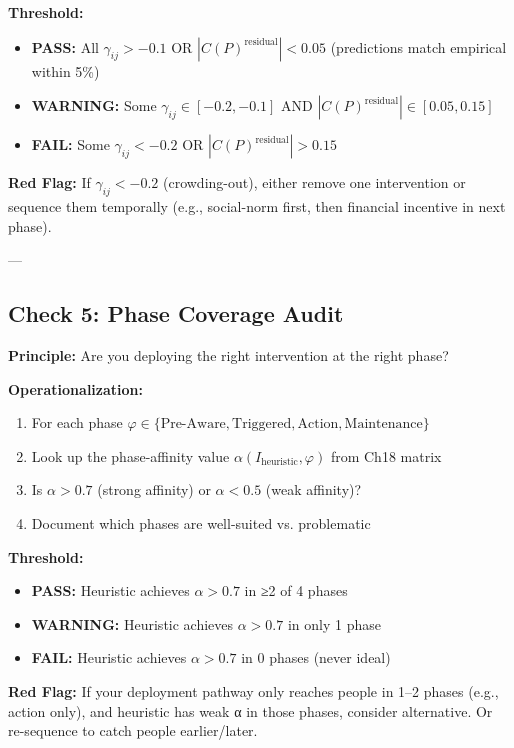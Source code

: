 \textbf{Threshold:}
\begin{itemize}[nosep]
\item \textbf{PASS:} All $\gamma_{ij} > -0.1$ OR $|C(P)^{\text{residual}}| < 0.05$ (predictions match empirical within 5\%)
\item \textbf{WARNING:} Some $\gamma_{ij} \in [-0.2, -0.1]$ AND $|C(P)^{\text{residual}}| \in [0.05, 0.15]$
\item \textbf{FAIL:} Some $\gamma_{ij} < -0.2$ OR $|C(P)^{\text{residual}}| > 0.15$
\end{itemize}

\textbf{Red Flag:} If $\gamma_{ij} < -0.2$ (crowding-out), either remove one intervention or sequence them temporally (e.g., social-norm first, then financial incentive in next phase).

---

\subsection{Check 5: Phase Coverage Audit}
\label{subsec:20-check-5}

\textbf{Principle:} Are you deploying the right intervention at the right phase?

\textbf{Operationalization:}

\begin{enumerate}
\item For each phase $\varphi \in \{\text{Pre-Aware}, \text{Triggered}, \text{Action}, \text{Maintenance}\}$
\item Look up the phase-affinity value $\alpha(I_{\text{heuristic}}, \varphi)$ from Ch18 matrix
\item Is $\alpha > 0.7$ (strong affinity) or $\alpha < 0.5$ (weak affinity)?
\item Document which phases are well-suited vs. problematic
\end{enumerate}

\textbf{Threshold:}
\begin{itemize}[nosep]
\item \textbf{PASS:} Heuristic achieves $\alpha > 0.7$ in ≥2 of 4 phases
\item \textbf{WARNING:} Heuristic achieves $\alpha > 0.7$ in only 1 phase
\item \textbf{FAIL:} Heuristic achieves $\alpha > 0.7$ in 0 phases (never ideal)
\end{itemize}

\textbf{Red Flag:} If your deployment pathway only reaches people in 1--2 phases (e.g., action only), and heuristic has weak α in those phases, consider alternative. Or re-sequence to catch people earlier/later.

